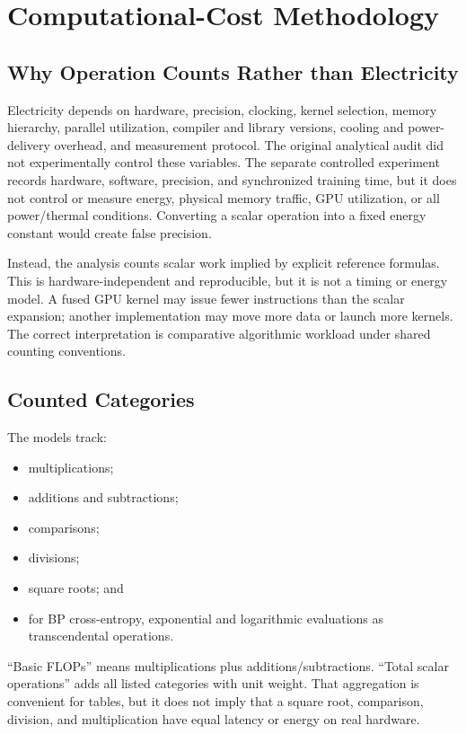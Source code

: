 \documentclass{article}
\begin{document}
    \section{Computational-Cost Methodology}
    
    \subsection{Why Operation Counts Rather than Electricity}
    
    Electricity depends on hardware, precision, clocking, kernel selection, memory hierarchy, parallel utilization, compiler and library versions, cooling and power-delivery overhead, and measurement protocol. {\color{red}The original analytical audit did not experimentally control these variables. The separate controlled experiment records hardware, software, precision, and synchronized training time, but it does not control or measure energy, physical memory traffic, GPU utilization, or all power/thermal conditions.} Converting a scalar operation into a fixed energy constant would create false precision.
    
    Instead, the analysis counts scalar work implied by explicit reference formulas. This is hardware-independent and reproducible, but it is not a timing or energy model. A fused GPU kernel may issue fewer instructions than the scalar expansion; another implementation may move more data or launch more kernels. The correct interpretation is comparative algorithmic workload under shared counting conventions.
    
    \subsection{Counted Categories}
    
    The models track:
    \begin{itemize}[noitemsep]
    \item multiplications;
    \item additions and subtractions;
    \item comparisons;
    \item divisions;
    \item square roots; and
    \item for BP cross-entropy, exponential and logarithmic evaluations as transcendental operations.
    \end{itemize}
    
    ``Basic FLOPs'' means multiplications plus additions/subtractions. ``Total scalar operations'' adds all listed categories with unit weight. That aggregation is convenient for tables, but it does not imply that a square root, comparison, division, and multiplication have equal latency or energy on real hardware.
    
\end{document}
